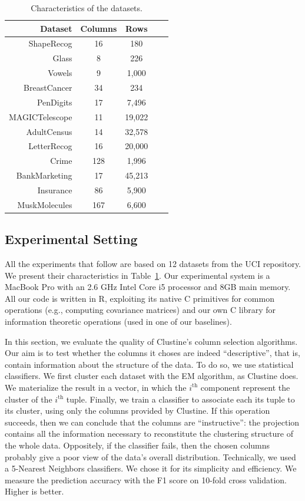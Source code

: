 \begin{table}[!t]
    \centering
    \small
    \begin{tabular}{r c c c c} 
        \hline
        Dataset & Columns & Rows\\
        \hline
        ShapeRecog & 16 & 180\\
        Glass & 8 & 226\\
        Vowels &  9&1,000  \\
        BreastCancer & 34 & 234\\
        PenDigits & 17 & 7,496\\
        MAGICTelescope & 11 & 19,022\\
        AdultCensus & 14 & 32,578\\
        LetterRecog & 16 & 20,000\\
        Crime & 128 & 1,996\\
        BankMarketing & 17 & 45,213\\
        Insurance & 86 & 5,900\\
        MuskMolecules & 167 & 6,600\\
        \hline
    \end{tabular}
    \caption{Characteristics of the datasets.}
    \label{tab:datasets}
\end{table}

\subsection{Experimental Setting}
All the experiments that follow are based on 12 datasets from the UCI
repository. We present their characteristics in Table~\ref{tab:datasets}. Our
experimental system is a MacBook Pro with an 2.6 GHz Intel Core i5 processor
and 8GB main memory. All our code is written in R, exploiting its native C
primitives for common operations (e.g., computing covariance matrices) and our
own C library for information theoretic operations (used in one of our
baselines).

In this section, we evaluate the quality of Clustine's column selection
algorithms. Our aim is to test whether the columns it choses are indeed
``descriptive'', that is, contain information about the structure of the data.
To do so, we use statistical classifiers. We first cluster each dataset with
the EM algorithm, as Clustine does. We materialize the result in a vector, in
which the $i^{\text{th}}$ component represent the cluster of the
$i^{\text{th}}$ tuple. Finally, we train a classifier to associate each its
tuple to its cluster, using only the columns provided by Clustine. If this
operation succeeds, then we can conclude that the columns are ``instructive'':
the projection contains all the information necessary to reconstitute the
clustering structure of the whole data. Oppositely, if the classifier fails,
then the chosen columns probably give a poor view of the data's overall
distribution.  Technically, we used a 5-Nearest Neighbors classifiers. We chose
it for its simplicity and efficiency. We measure the prediction accuracy with
the F1 score on 10-fold cross validation. Higher is better.


